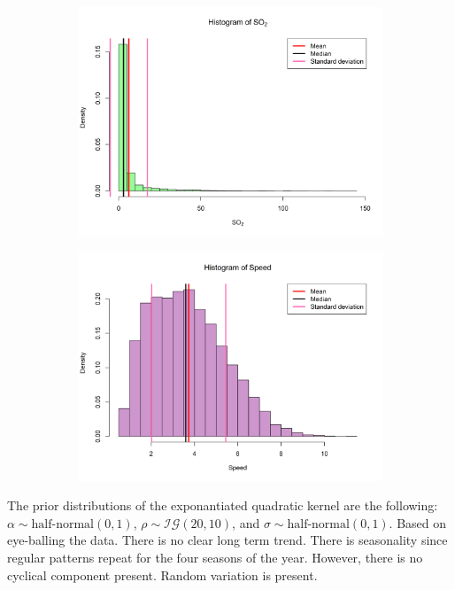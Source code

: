 \documentclass[a4paper, 10pt]{article}
\begin{document}
\begin{flushleft}
\begin{figure}[H]
         \begin{subfigure}[t]{0.48\linewidth}
            \centering
            \includegraphics[width=\linewidth]{../images/so2_hist_2019.png}
         \end{subfigure}
         \hfill
         \begin{subfigure}[t]{0.48\linewidth}
            \centering
            \includegraphics[width=\linewidth]{../images/speed_hist_2019.png}
         \end{subfigure}
      \end{figure}

      The prior distributions of the exponantiated quadratic kernel are the following: $\alpha \sim \text{half-normal}(0, 1)$, $\rho \sim \mathcal{IG}(20, 10)$, and $\sigma \sim \text{half-normal}(0, 1)$. Based on eye-balling the data. There is no clear long term trend. There is seasonality since regular patterns repeat for the four seasons of the year. However, there is no cyclical component present. Random variation is present.
   

\end{flushleft}
\end{document}
